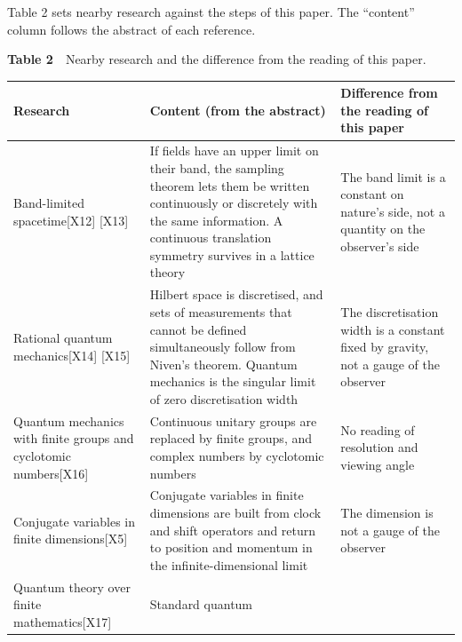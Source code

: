 \documentclass[
  a4paper,
]{article}
\newcounter{none} %
\begin{document}
Table 2 sets nearby research against the steps of this paper. The
``content'' column follows the abstract of each reference.

\textbf{Table 2}　Nearby research and the difference from the reading of
this paper.

{\def\LTcaptype{none} %
\begin{longtable}[]{@{}
  >{\raggedright\arraybackslash}p{}
  >{\raggedright\arraybackslash}p{}
  >{\raggedright\arraybackslash}p{}@{}}
\toprule\noalign{}
\begin{minipage}[b]{\linewidth}\raggedright
Research
\end{minipage} & \begin{minipage}[b]{\linewidth}\raggedright
Content (from the abstract)
\end{minipage} & \begin{minipage}[b]{\linewidth}\raggedright
Difference from the reading of this paper
\end{minipage} \\
\midrule\noalign{}
\endhead
\bottomrule\noalign{}
\endlastfoot
Band-limited spacetime{[}X12{]} {[}X13{]} & If fields have an upper
limit on their band, the sampling theorem lets them be written
continuously or discretely with the same information. A continuous
translation symmetry survives in a lattice theory & The band limit is a
constant on nature's side, not a quantity on the observer's side \\
Rational quantum mechanics{[}X14{]} {[}X15{]} & Hilbert space is
discretised, and sets of measurements that cannot be defined
simultaneously follow from Niven's theorem. Quantum mechanics is the
singular limit of zero discretisation width & The discretisation width
is a constant fixed by gravity, not a gauge of the observer \\
Quantum mechanics with finite groups and cyclotomic numbers{[}X16{]} &
Continuous unitary groups are replaced by finite groups, and complex
numbers by cyclotomic numbers & No reading of resolution and viewing
angle \\
Conjugate variables in finite dimensions{[}X5{]} & Conjugate variables
in finite dimensions are built from clock and shift operators and return
to position and momentum in the infinite-dimensional limit & The
dimension is not a gauge of the observer \\
Quantum theory over finite mathematics{[}X17{]} & Standard quantum

\end{longtable}}
\end{document}
